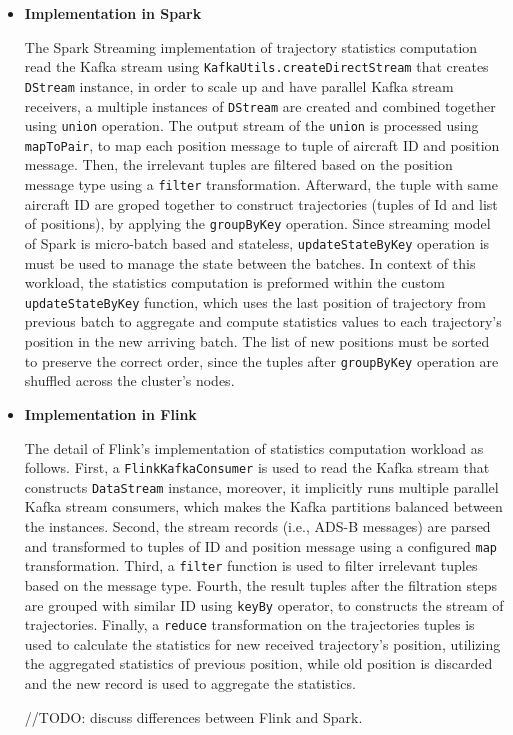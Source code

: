 \documentclass[]{article}
\begin{document}
\begin{itemize}
\item {\bf{Implementation in Spark }}

\par The Spark Streaming implementation of trajectory statistics computation read the Kafka stream using \texttt{KafkaUtils.createDirectStream} that creates \texttt{DStream} instance, in order to scale up and have parallel Kafka stream receivers, a multiple instances of \texttt{DStream} are created and combined together using \texttt{union} operation. The output stream of the \texttt{union} is processed using \texttt{mapToPair}, to map each position message to tuple of aircraft ID and position message. Then, the irrelevant tuples are filtered based on the position message type using  a \texttt{filter} transformation. Afterward, the tuple with same aircraft ID are groped together to construct trajectories (tuples of Id and list of positions), by applying the \texttt{groupByKey} operation. Since streaming model of Spark is micro-batch based and stateless, \texttt{updateStateByKey} operation is must be used to manage the state between the batches. In context of this workload, the statistics computation is preformed within the custom \texttt{updateStateByKey} function, which uses the last position of trajectory from previous batch to aggregate and compute statistics values to each trajectory's position in the new arriving batch.  The list of new positions must be sorted to preserve the correct order, since the tuples after \texttt{groupByKey} operation are shuffled across the cluster's  nodes.

\item {\bf{Implementation in Flink }}


The detail of Flink's implementation of statistics computation workload as follows. First, a \texttt{FlinkKafkaConsumer} is used to read the Kafka stream that constructs \texttt{DataStream} instance, moreover, it implicitly runs multiple parallel Kafka stream consumers, which makes the Kafka partitions balanced between the instances. Second, the stream records (i.e., ADS-B messages) are parsed and transformed to tuples of ID and position message using a configured \texttt{map} transformation. Third, a \texttt{filter} function is used to filter irrelevant tuples based on the message type. Fourth, the result tuples after the filtration steps are grouped with similar ID using \texttt{keyBy} operator, to constructs the stream of trajectories. Finally, 
a \texttt{reduce} transformation on the trajectories tuples is used to calculate the statistics for new received trajectory's position, utilizing the aggregated statistics of previous position, while old position is discarded and the new record is used to aggregate the statistics.


//TODO: discuss differences between Flink and Spark.

\end{itemize}
\end{document}
